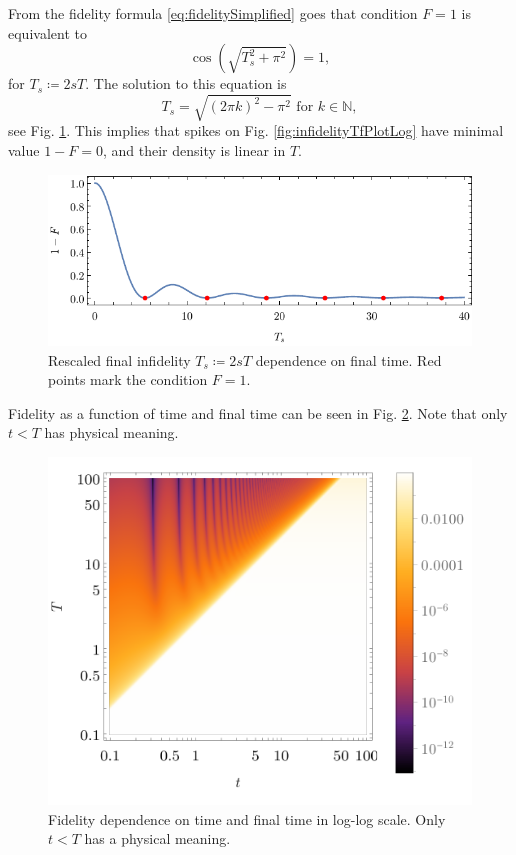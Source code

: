 From the fidelity formula \ref{eq:fidelitySimplified} goes that condition $F=1$ is equivalent to
\begin{equation}
    \cos \left(\sqrt{T_s^2+\pi ^2}\right)=1,
\end{equation}
for $T_s\coloneqq 2s T$. The solution to this equation is
\begin{equation}
    T_s=\sqrt{(2 \pi  k)^2-\pi ^2} \text{  for }k\in \mathbb{N},
    \label{eq:solutionT}
\end{equation}
see Fig. \ref{fig:fidelityZeros}. This implies that spikes on Fig. \ref{fig:infidelityTfPlotLog} have minimal value $1-F=0$, and their density is linear in $T$.
\begin{figure}[H]
    \centering
    \includegraphics[scale=1.2]{../img/fidelityZeros.pdf}
    \caption{Rescaled final infidelity $T_s\coloneqq 2s T$ dependence on final time. Red points mark the condition $F=1$.}
    \label{fig:fidelityZeros}
\end{figure}


Fidelity as a function of time and final time can be seen in Fig. \ref{fig:dens3}. Note that only $t<T$ has physical meaning.

\begin{figure}[H]
    \centering
    \includegraphics[scale=1.2]{../img/dens3.pdf}
    \caption{Fidelity dependence on time and final time in log-log scale. Only $t<T$ has a physical meaning.}
    \label{fig:dens3}
\end{figure}

